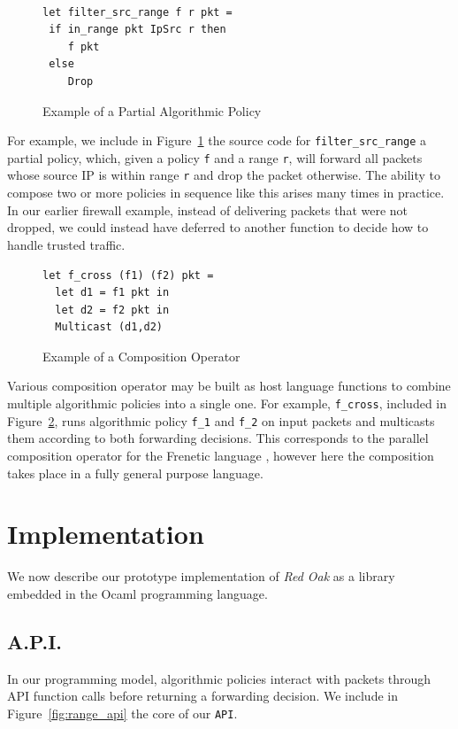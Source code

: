 \documentclass[preprint]{sigplanconf}
\begin{document}
\begin{figure}[ht]
\begin{lstlisting}

let filter_src_range f r pkt =
 if in_range pkt IpSrc r then
    f pkt
 else
    Drop   
\end{lstlisting}

\caption{Example of a Partial Algorithmic Policy}
\label{fig:ex-hole}
\end{figure}

   
   For example, we include in Figure~\ref{fig:ex-hole} the source code for \lstinline|filter_src_range| a partial policy, which, given a policy \lstinline|f| and a range \lstinline|r|, will forward all packets whose source IP is within range \lstinline|r| and drop the packet otherwise. The ability to compose two or more policies in sequence like this arises many times in practice. In our earlier firewall example, instead of delivering packets that were not dropped, we could instead have deferred to another function to decide how to handle trusted traffic.


   \begin{figure}[ht]
\begin{lstlisting}
let f_cross (f1) (f2) pkt =
  let d1 = f1 pkt in
  let d2 = f2 pkt in
  Multicast (d1,d2)
\end{lstlisting}

\caption{Example of a Composition Operator}
\label{fig:ex-cross}
\end{figure}
   
Various composition operator may be built as host language functions to combine multiple algorithmic policies into a single one. For example, \lstinline|f_cross|, included in Figure~\ref{fig:ex-cross}, runs algorithmic policy \lstinline|f_1| and \lstinline|f_2| on input packets and multicasts them according to both forwarding decisions. This corresponds to the parallel composition operator for the Frenetic language \cite{Frenetic}, however here the composition takes place in a fully general purpose language.
   
\section*{Implementation}

We now describe our prototype implementation of \textit{Red Oak} as a library embedded in the Ocaml programming language.

\subsection*{A.P.I.}
In our programming model, algorithmic policies interact with packets through API function calls before returning a forwarding decision. We include in Figure~\ref{fig:range_api} the core of our \lstinline|API|.
\end{document}
